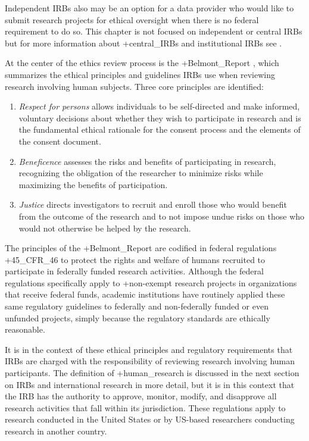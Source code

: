 \documentclass[
]{WileySix}
\providecommand{\tightlist}{%
  \setlength{\itemsep}{0pt}\setlength{\parskip}{0pt}}
\begin{document}
Independent IRBs also may be an option for a data provider who would like to submit research projects for ethical oversight when there is no federal requirement to do so. This chapter is not focused on independent or central IRBs but for more information about +central\_IRBs\textbar{} and institutional IRBs see \citet{wandile2018}.

At the center of the ethics review process is the +Belmont\_Report\textbar{} \citep{unitedstates1978}, which summarizes the ethical principles and guidelines IRBs use when reviewing research involving human subjects. Three core principles are identified:

\begin{enumerate}
\def\labelenumi{\arabic{enumi}.}
\tightlist
\item
  \emph{Respect for persons} allows individuals to be self-directed and make informed, voluntary decisions about whether they wish to participate in research and is the fundamental ethical rationale for the consent process and the elements of the consent document.
\item
  \emph{Beneficence} assesses the risks and benefits of participating in research, recognizing the obligation of the researcher to minimize risks while maximizing the benefits of participation.
\item
  \emph{Justice} directs investigators to recruit and enroll those who would benefit from the outcome of the research and to not impose undue risks on those who would not otherwise be helped by the research.
\end{enumerate}

The principles of the +Belmont\_Report\textbar{} are codified in federal regulations +45\_CFR\_46\textbar{} to protect the rights and welfare of humans recruited to participate in federally funded research activities. Although the federal regulations specifically apply to +non-exempt\textbar{} research projects in organizations that receive federal funds, academic institutions have routinely applied these same regulatory guidelines to federally and non-federally funded or even unfunded projects, simply because the regulatory standards are ethically reasonable.

It is in the context of these ethical principles and regulatory requirements that IRBs are charged with the responsibility of reviewing research involving human participants. The definition of +human\_research\textbar{} is discussed in the next section on IRBs and international research in more detail, but it is in this context that the IRB has the authority to approve, monitor, modify, and disapprove all research activities that fall within its jurisdiction. These regulations apply to research conducted in the United States or by US-based researchers conducting research in another country.
\end{document}
